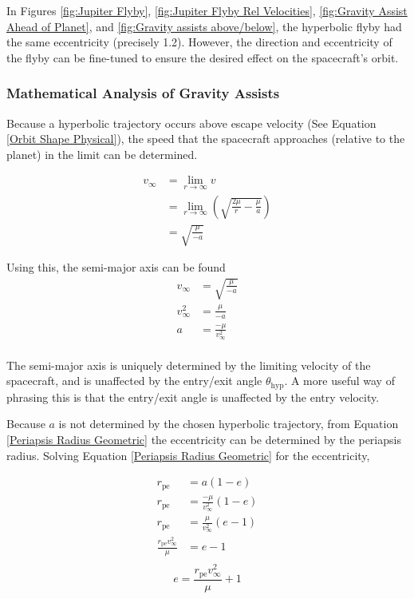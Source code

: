 \documentclass[../main.tex]{subfiles}
\begin{document}
In Figures \ref{fig:Jupiter Flyby}, \ref{fig:Jupiter Flyby Rel Velocities}, \ref{fig:Gravity Assist Ahead of Planet}, and \ref{fig:Gravity assists above/below}, the hyperbolic flyby had the same eccentricity (precisely 1.2). However, the direction and eccentricity of the flyby can be fine-tuned to ensure the desired effect on the spacecraft's orbit.

\subsubsection{Mathematical Analysis of Gravity Assists}

Because a hyperbolic trajectory occurs above escape velocity (See Equation \eqref{Orbit Shape Physical}), the speed that the spacecraft approaches (relative to the planet) in the limit can be determined.

\begin{align*}
    v_\infty & = \lim_{r\rightarrow\infty}v                                                \\
             & = \lim_{r\rightarrow\infty}\left(\sqrt{\frac{2\mu}{r}-\frac{\mu}{a}}\right) \\
             & = \sqrt{\frac{\mu}{-a}}
\end{align*}

Using this, the semi-major axis can be found
\begin{align*}
    v_\infty   & = \sqrt{\frac{\mu}{-a}}   \\
    v_\infty^2 & = \frac{\mu}{-a}          \\
    a          & = \frac{-\mu}{v_\infty^2} \\
\end{align*}

The semi-major axis is uniquely determined by the limiting velocity of the spacecraft, and is unaffected by the entry/exit angle $\theta_\text{hyp}$. A more useful way of phrasing this is that the entry/exit angle is unaffected by the entry velocity.

Because $a$ is not determined by the chosen hyperbolic trajectory, from Equation \eqref{Periapsis Radius Geometric} the eccentricity can be determined by the periapsis radius. Solving Equation \eqref{Periapsis Radius Geometric} for the eccentricity,

\begin{align*}
    r_\text{pe}                       & =a(1-e)                       \\
    r_\text{pe}                       & =\frac{-\mu}{v_\infty^2}(1-e) \\
    r_\text{pe}                       & =\frac{\mu}{v_\infty^2}(e-1)  \\
    \frac{r_\text{pe}v_\infty^2}{\mu} & =e-1                          \\
\end{align*}
\begin{equation}\label{Hyperbolic Flyby Eccentricity}
    e=\frac{r_\text{pe}v_\infty^2}{\mu}+1
\end{equation}
\end{document}
